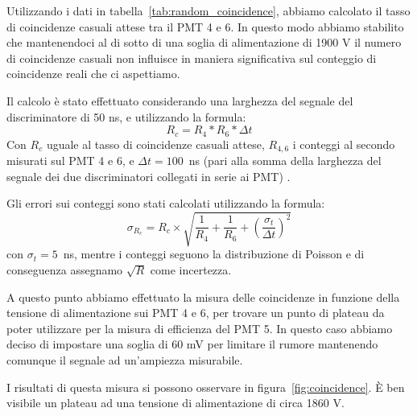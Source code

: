 \documentclass[a4paper,10pt]{article}
\begin{document}
Utilizzando i dati in tabella~\ref{tab:random_coincidence}, abbiamo calcolato il tasso di coincidenze casuali attese tra il PMT 4 e 6. In questo modo abbiamo stabilito che mantenendoci al di sotto di una soglia di alimentazione di 1900 V il numero di coincidenze casuali non influisce in maniera significativa sul conteggio di coincidenze reali che ci aspettiamo. 

Il calcolo è stato effettuato considerando una larghezza del segnale del discriminatore di 50 ns, e utilizzando la formula:
\begin{equation}
R_{c} = R_{4}*R_{6}*\Delta t
\label{eq:random_coincidence}
\end{equation}
Con $R_{c}$ uguale al tasso di coincidenze casuali attese, $R_{4,6}$ i conteggi al secondo misurati sul PMT 4 e 6, e $\Delta t = 100$~ns (pari alla somma della larghezza del segnale dei due discriminatori collegati in serie ai PMT) .

Gli errori sui conteggi sono stati calcolati utilizzando la formula:
\begin{equation}
\sigma_{R_{c}} = R_{c} \times{\sqrt{\frac{1}{R_{4}} + \frac{1}{R_{6}} + \left( \frac{\sigma_{t}}{\Delta t} \right)^2}  }
\end{equation}
con $\sigma_{t} = 5$~ns, mentre i conteggi seguono la distribuzione di Poisson e di conseguenza assegnamo $\sqrt{R}$ come incertezza.

A questo punto abbiamo effettuato la misura delle coincidenze in funzione della tensione di alimentazione sui PMT 4 e 6, per trovare un punto di plateau da poter utilizzare per la misura di efficienza del PMT 5.
In questo caso abbiamo deciso di impostare una soglia di 60 mV per limitare il rumore mantenendo comunque il segnale ad un'ampiezza misurabile. 

I risultati di questa misura si possono osservare in figura~\ref{fig:coincidence}. \`E ben visibile un plateau ad una tensione di alimentazione di circa 1860 V.	
\end{document}
